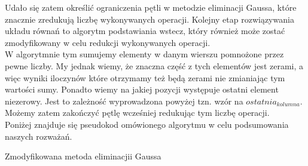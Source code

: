 \documentclass[]{article}
\newcommand{\mA}{\bm{A}}
\newcommand{\vb}{\bm{b}}
\newcommand{\vx}{\bm{x}}
\begin{document}
	Udało się zatem określić ograniczenia pętli w metodzie eliminacji Gaussa, które znacznie zredukują liczbę wykonywanych operacji. Kolejny etap rozwiązywania układu równań to algorytm podstawiania wstecz, który również może zostać zmodyfikowany w celu redukcji wykonywanych operacji.\\
	W algorytmnie tym sumujemy elementy w danym wierszu pomnożone przez pewne liczby. My jednak wiemy, że znaczna część z tych elementów jest zerami, a więc wyniki iloczynów które otrzymamy też będą zerami nie zmianiając tym wartości sumy. Ponadto wiemy na jakiej pozycji występuje ostatni element niezerowy. Jest to zależność wyprowadzona powyżej tzn. wzór na $ostatnia_{kolumna}$. Możemy zatem zakończyć pętlę wcześniej redukując tym liczbę operacji.\\
	Poniżej znajduje się pseudokod omówionego algorytmu w celu podsumowania naszych rozważań.
\begin{algorithm}[h]
	\DontPrintSemicolon
	
	\SetKwData{B}{$\vb$}    		
	\SetKwData{A}{$\mA$}    			
	\SetKwData{X}{$\vx$}
	
	\caption{Zmodyfikowana metoda eliminacjii Gaussa}
\end{algorithm} 
\end{document}
